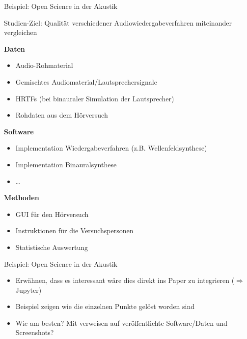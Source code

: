 \documentclass{beamer}
\begin{document}
\begin{frame}{Beispiel: Open Science in der Akustik}

    Studien-Ziel: Qualität verschiedener Audiowiedergabeverfahren miteinander
    vergleichen

    \textbf{Daten}
    \begin{itemize}
        \item Audio-Rohmaterial
        \item Gemischtes Audiomaterial/Lautsprechersignale
        \item HRTFs (bei binauraler Simulation der Lautsprecher)
        \item Rohdaten aus dem Hörversuch
    \end{itemize}

    \textbf{Software}
    \begin{itemize}
        \item Implementation Wiedergabeverfahren (z.B. Wellenfeldsynthese)
        \item Implementation Binauralsynthese
        \item \dots
    \end{itemize}

    \textbf{Methoden}
    \begin{itemize}
        \item GUI für den Hörversuch
        \item Instruktionen für die Versuchspersonen
        \item Statistische Auswertung
    \end{itemize}

\end{frame}

\begin{frame}{Beispiel: Open Science in der Akustik}

    \begin{itemize}
        \item Erwähnen, dass es interessant wäre dies direkt ins Paper zu
            integrieren ($\Rightarrow$ Jupyter)
        \item Beispiel zeigen wie die einzelnen Punkte gelöst worden sind
        \item Wie am besten? Mit verweisen auf veröffentlichte Software/Daten
            und Screenshots?
    \end{itemize}

\end{frame}
\end{document}
